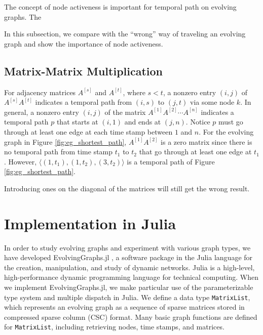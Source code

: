 \documentclass[11pt,conference,compsocconf]{IEEEtran}
\theoremstyle{definition}
\begin{document}
The concept of node activeness is important for temporal path on evolving graphs.
The 

In this subsection, we compare with the ``wrong'' way of traveling an evolving graph
and show the importance of node activeness.


\subsection{Matrix-Matrix Multiplication}
\label{sec:matr-matr-mult-1}

For adjacency matrices $A^{[s]}$ and $A^{[t]}$, where $s < t$, a nonzero entry
$(i,j)$ of $A^{[s]} A^{[t]}$ indicates a temporal path from $(i,s)$ to $(j,t)$ via
some node $k$.
In general, a nonzero entry $(i,j)$ of the matrix $A^{[1]}A^{[2]}\cdots A^{[n]}$
indicates a temporal path $p$ that starts at $(i,1)$ and ends at  $(j,n)$.
Notice $p$ must go through at least one edge at each time stamp between $1$ and $n$.
For the evolving graph in Figure \ref{fig:eg_shortest_path}, $A^{[1]}A^{[2]}$
is a zero matrix since there is no temporal path from time stamp $t_1$ to $t_2$ that
go through at least one edge at $t_1$. However,
$\langle(1, t_1), (1, t_2), (3,t_2)\rangle$ is a temporal path of Figure \ref{fig:eg_shortest_path}.

Introducing ones on the diagonal of the matrices will still get the wrong result.


\section{Implementation in Julia}
\label{sec:implementation-julia}

In order to study evolving graphs and experiment with various graph types, we have developed EvolvingGraphs.jl  \cite{zhang15}, a software package in the Julia language \cite{bkse12} for the creation, manipulation, and study of dynamic networks.
Julia is a high-level, high-performance dynamic programming language for technical
computing. When we implement EvolvingGraphs.jl, we make particular use of
the parameterizable type system and multiple dispatch in Julia.
We define a data type  \texttt{MatrixList}, which represents an evolving graph
as a sequence of sparse matrices stored in compressed sparse column (CSC) format.
Many basic graph functions are defined for \texttt{MatrixList}, including
retrieving nodes, time stamps, and matrices.
\end{document}
